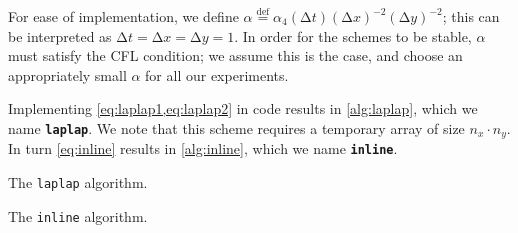 \documentclass[british]{scrreprt}
\begin{document}
For ease of implementation, we define \( \alpha \stackrel{\mathrm{def}}{=} \alpha_4 (\increment t) (\increment x)^{-2} (\increment y)^{-2} \); this can be interpreted as \( \increment t = \increment x = \increment y = 1 \). In order for the schemes to be stable, \( \alpha \) must satisfy the CFL condition; we assume this is the case, and choose an appropriately small \( \alpha \) for all our experiments.

Implementing \cref{eq:laplap1,eq:laplap2} in code results in \cref{alg:laplap}, which we name \textbf{\texttt{laplap}}. We note that this scheme requires a temporary array of size \( n_{x} \cdot n_{y} \). In turn \cref{eq:inline} results in \cref{alg:inline}, which we name \textbf{\texttt{inline}}.

\begin{algorithm}
	\caption{The \texttt{laplap} algorithm.}
	\label{alg:laplap}
\end{algorithm}

\begin{algorithm}
	\caption{The \texttt{inline} algorithm.}
	\label{alg:inline}
\end{algorithm}
\end{document}
